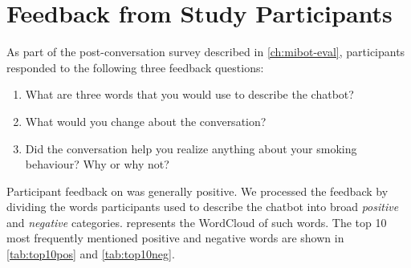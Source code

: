\chapter{\sysname Feedback from Study Participants}
\label{app-feedback}

As part of the post-conversation survey described in \cref{ch:mibot-eval}, participants responded to the following three feedback questions:

\begin{tcolorbox}[breakable,
                  colback=magenta!5!blue!10,        %
  colframe=magenta!60!blue!40,      %
                  fonttitle=\bfseries, %
                  fontupper=\small,
                  title=\section{Feedback Survey Questions}]

\begin{enumerate}
    \item What are three words that you would use to describe the chatbot?
    \item What would you change about the conversation?
    \item Did the conversation help you realize anything about your smoking behaviour? Why or why not?
\end{enumerate}

\end{tcolorbox}



Participant feedback on \sysname was generally positive. We processed the feedback by dividing the words participants used to describe the chatbot into broad \textit{positive} and \textit{negative} categories.  represents the WordCloud \citep{oesper2011wordcloud} of such words. The top 10 most frequently mentioned positive and negative words are shown in \cref{tab:top10pos} and \cref{tab:top10neg}.


\renewcommand{\thetable}{J.\arabic{table}}
\setcounter{table}{0}

